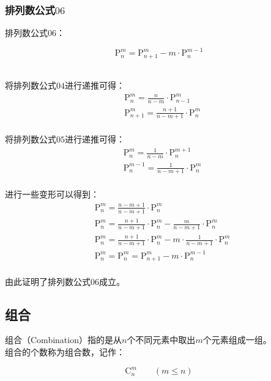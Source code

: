 \documentclass[UTF8]{ctexart}
\newcommand{\Pe}{\mathrm{P}}
\newcommand{\Co}{\mathrm{C}}
\begin{document}
\subsubsection{排列数公式$06$}
    排列数公式$06$：
    \begin{large}
        \begin{equation*}
            \Pe_n^m=\Pe_{n+1}^m-m\cdot\Pe_n^{m-1}
        \end{equation*}
    \end{large}\\
    将排列数公式$04$进行递推可得：
    \setcounter{equation}{0}
    \begin{align}
        &\Pe_n^m=\frac{n}{n-m}\cdot\Pe_{n-1}^{m}\\[3mm]
        &\Pe_{n+1}^m=\frac{n+1}{n-m+1}\cdot\Pe_{n}^{m}
    \end{align}\\
    将排列数公式$05$进行递推可得：
    \begin{align}
        &\Pe_n^m=\frac{1}{n-m}\cdot\Pe_{n}^{m+1}\\[3mm]
        &\Pe_n^{m-1}=\frac{1}{n-m+1}\cdot\Pe_{n}^{m}
    \end{align}\\
    进行一些变形可以得到：
    \begin{align}
        &\Pe_n^m=\frac{n-m+1}{n-m+1}\cdot\Pe_n^m\\[3mm]
        &\Pe_n^m=\frac{n+1}{n-m+1}\cdot\Pe_n^m-\frac{m}{n-m+1}\cdot\Pe_n^m\\[3mm]
        &\Pe_n^m=\frac{n+1}{n-m+1}\cdot\Pe_n^m-m\cdot\frac{1}{n-m+1}\cdot\Pe_n^m\\[3mm]
        &\Pe_n^m=\Pe_n^m=\Pe_{n+1}^m-m\cdot\Pe_n^{m-1}
    \end{align}\\
    由此证明了排列数公式$06$成立。

\newpage

\subsection{组合}
    组合（Combination）指的是从$n$个不同元素中取出$m$个元素组成一组。\\[3mm]
    组合的个数称为组合数，记作：
    \begin{large}
        \begin{equation*}
            \Co_n^m\qquad(m\leq n)
        \end{equation*}
    \end{large}\vspace{-5pt}
\end{document}
